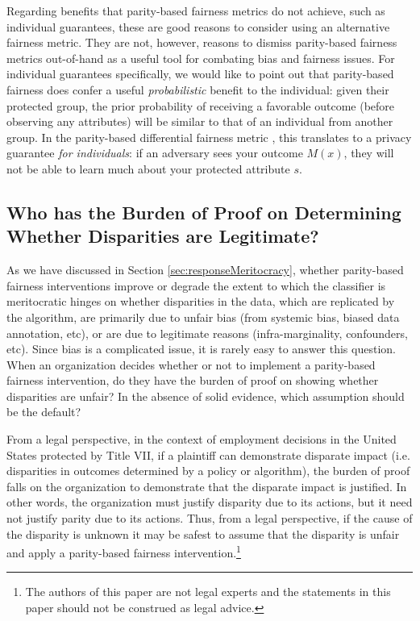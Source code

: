 \documentclass[11pt,dvipdfm]{article}
\begin{document}
Regarding benefits that parity-based fairness metrics do not achieve, such as individual guarantees, these are good reasons to consider using an alternative fairness metric.  They are not, however, reasons to dismiss parity-based fairness metrics out-of-hand as a useful tool for combating bias and fairness issues. For individual guarantees specifically, we would like to point out that parity-based fairness does confer a useful \emph{probabilistic} benefit to the individual: given their protected group, the prior probability of receiving a favorable outcome (before observing any attributes) will be similar to that of an individual from another group.  In the parity-based differential fairness metric \cite{foulds2020intersectional}, this translates to a privacy guarantee \emph{for individuals}: if an adversary sees your outcome $M(x)$, they will not be able to learn much about your protected attribute $s$.  

\subsection{Who has the Burden of Proof on Determining Whether Disparities are Legitimate?}

As we have discussed in Section \ref{sec:responseMeritocracy}, whether parity-based fairness interventions improve or degrade  the extent to which the classifier is meritocratic hinges on whether disparities in the data, which are replicated by the algorithm, are primarily due to unfair bias (from systemic bias, biased data annotation, etc), or are due to legitimate reasons (infra-marginality, confounders, etc).  Since bias is a complicated issue, it is rarely easy to answer this question.  When an organization decides whether or not to implement a parity-based fairness intervention, do they have the burden of proof on showing whether disparities are unfair?  In the absence of solid evidence, which assumption should be the default?

From a legal perspective, in the context of employment decisions in the United States protected by Title VII, if a plaintiff can demonstrate disparate impact (i.e. disparities in outcomes determined by a policy or algorithm), the burden of proof falls on the organization to demonstrate that the disparate impact is justified.  In other words, the organization must justify disparity due to its actions, but it need not justify parity due to its actions.  Thus, from a legal perspective, if the cause of the disparity is unknown it may be safest to assume that the disparity is unfair and apply a parity-based fairness intervention.\footnote{The authors of this paper are not legal experts and the statements in this paper should not be construed as legal advice.}
\end{document}
